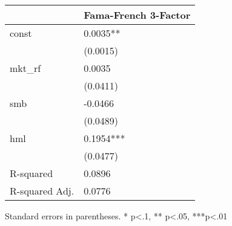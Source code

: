 \begin{table}
\caption{}
\label{}
\begin{center}
\begin{tabular}{ll}
\hline
               & Fama-French 3-Factor  \\
\hline
const          & 0.0035**              \\
               & (0.0015)              \\
mkt\_rf        & 0.0035                \\
               & (0.0411)              \\
smb            & -0.0466               \\
               & (0.0489)              \\
hml            & 0.1954***             \\
               & (0.0477)              \\
R-squared      & 0.0896                \\
R-squared Adj. & 0.0776                \\
\hline
\end{tabular}
\end{center}
\end{table}
\bigskip
Standard errors in parentheses. \newline 
* p<.1, ** p<.05, ***p<.01